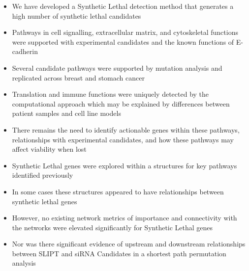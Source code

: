    \begin{itemize}
   \item We have developed a Synthetic Lethal detection method that generates a high number of \gls{synthetic lethal} candidates
   
   \bigskip
   
   \item Pathways in cell signalling, extracellular matrix, and cytoskeletal functions were supported with experimental candidates and the known functions of \gls{E-cadherin}
   
   \bigskip
   
   \item Several candidate pathways were supported by \gls{mutation} analysis and replicated across breast and stomach cancer
   
   \bigskip
   
   \item Translation and immune functions were uniquely detected by the computational approach which may be explained by differences between patient samples and cell line models
   
   \bigskip
   
   \item There remains the need to identify actionable genes within these pathways, relationships with experimental candidates, and how these pathways may affect viability when lost
  \end{itemize}
  
    \begin{itemize}
   \item Synthetic Lethal genes were explored within a  structures for key pathways identified previously 
   
   \bigskip
   
   \item In some cases these  structures appeared to have relationships between \gls{synthetic lethal} genes  
   
   \bigskip
   
   \item However, no existing network metrics of importance and connectivity with the networks were elevated significantly for Synthetic Lethal genes
   
   \bigskip
   
   \item Nor was there significant evidence of upstream and downstream relationships between SLIPT and \gls{siRNA} Candidates in a \gls{shortest path} permutation analysis
  \end{itemize}
  
